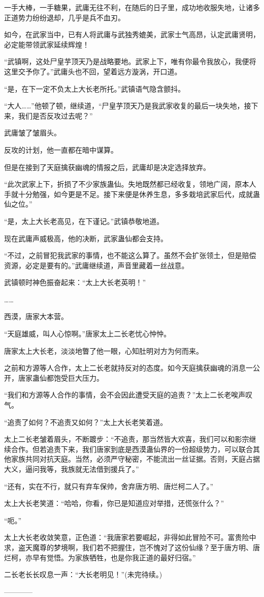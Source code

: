 \begin{this_body}
一手大棒，一手糖果，武庸无往不利，在随后的日子里，成功地收服失地，让诸多正道势力纷纷退却，几乎是兵不血刃。

如今，在武家当中，已有人将武庸与武独秀媲美，武家士气高昂，认定武庸贤明，必定能带领武家延续辉煌！

“武镇啊，这处尸皇芋顶天乃是战略要地。武家上下，唯有你最令我放心，我便将这里交予你了。”武庸头也不回，望着远方漩涡，开口道。

“是，在下一定不负太上大长老所托。”武镇语气隐含颤抖。

“大人……”他顿了顿，继续道，“尸皇芋顶天乃是我武家收复的最后一块失地，接下来，我们是否反攻过去呢？”

武庸皱了皱眉头。

反攻的计划，他一直都在暗中谋算。

但是在接到了天庭擒获幽魂的情报之后，武庸却是决定选择放弃。

“此次武家上下，折损了不少家族蛊仙。失地既然都已经收复，领地广阔，原本人手就十分勉强，如今更是不足。接下来便是休养生息，多多栽培武家后代，成就蛊仙之位。”

“是，太上大长老高见，在下谨记。”武镇恭敬地道。

现在武庸声威极高，他的决断，武家蛊仙都会支持。

“不过，之前冒犯我武家的事情，也不能这么算了。虽然不会扩张领土，但是赔偿资源，必定是要有的。”武庸继续道，声音里藏着一丝战意。

武镇顿时神色振奋起来：“太上大长老英明！”

……

西漠，唐家大本营。

“天庭雄威，叫人心惊啊。”唐家太上二长老忧心忡忡。

唐家太上大长老，淡淡地瞥了他一眼，心知肚明对方为何而来。

之前和方源等人合作，太上二长老就持反对的态度。如今天庭擒获幽魂的消息一公开，唐家蛊仙都饱受巨大压力。

“我们和方源等人合作的事情，会不会因此遭受天庭的追责？”太上二长老唉声叹气。

“追责了如何？不追责又如何？”太上大长老笑着道。

太上二长老皱着眉头，不断踱步：“不追责，那当然皆大欢喜，我们可以和影宗继续合作。但若追责下来，我们唐家到底是西漠蛊仙界的一份超级势力，可以联合其他家族共同对抗天庭。当然，必须严守秘密，不能流出一丝证据。否则，天庭占据大义，逼问我等，我族就无法借到援兵了。”

“还有，实在不行，就只有弃车保帅，舍弃唐方明、唐烂柯二人了。”

太上大长老笑道：“哈哈，你看，你已是知道应对举措，还慌张什么？”

“呃。”

太上大长老收敛笑意，正色道：“我唐家若要崛起，非得如此冒险不可。富贵险中求，盗天魔尊的梦境啊，我们若不把握住，岂不愧对了这份仙缘？至于唐方明、唐烂柯，亦早有觉悟。为家族牺牲，也是你我正道的最好归宿。”

二长老长长叹息一声：“大长老明见！”(未完待续。)

------------

\end{this_body}

